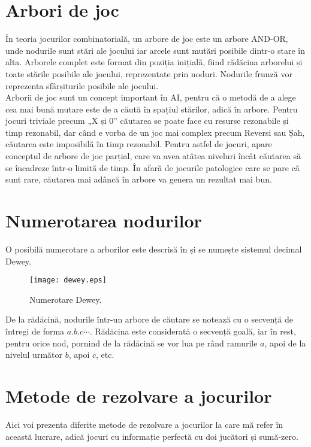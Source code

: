\documentclass[12pt,twoside,a4paper,fleqn]{book}
\theoremstyle{definition}
\begin{document}
\section{Arbori de joc}
În teoria jocurilor combinatorială, un arbore de joc este un arbore AND-OR, unde nodurile sunt stări ale jocului iar  arcele sunt mutări posibile dintr-o stare în alta. Arborele complet este format din poziția inițială, fiind rădăcina arborelui și toate stările posibile ale jocului, reprezentate prin noduri. Nodurile frunză vor reprezenta sfârșiturile posibile ale jocului.\\
Arborii de joc sunt un concept important în AI, pentru că o metodă de a alege cea mai bună mutare este de a căută în spațiul stărilor, adică în arbore. Pentru jocuri triviale precum „X și 0” căutarea se poate face cu resurse rezonabile și timp rezonabil, dar când e vorba de un joc mai complex precum Reversi sau Șah, căutarea este imposibilă în timp rezonabil. Pentru astfel de jocuri, apare conceptul de arbore de joc parțial, care va avea atâtea niveluri încât căutarea să se încadreze într-o limită de timp. În afară de jocurile patologice \cite{pathological} care se pare că sunt rare, căutarea mai adâncă în arbore va genera un rezultat mai bun.

\section{Numerotarea nodurilor}
O posibilă numerotare a arborilor este descrisă în \cite{sheng_hsu} și se numește sistemul decimal Dewey.

\begin{figure}[h]
\begin{center}
\texttt{[image: dewey.eps]}
\caption{\small{Numerotare Dewey.}}
\label{fig:dewey}
\end{center}
\end{figure}

De la rădăcină, nodurile într-un arbore de căutare se notează cu o secvență de întregi de forma $a.b.c\cdots$. Rădăcina este considerată o secvență goală, iar în rest, pentru orice nod, pornind de la rădăcină se vor lua pe rând ramurile $a$, apoi de la nivelul următor $b$, apoi $c$, etc.


\section{Metode de rezolvare a jocurilor}
Aici voi prezenta diferite metode de rezolvare a jocurilor la care mă refer în această lucrare, adică jocuri cu informație perfectă cu doi jucători și sumă-zero.
\end{document}
